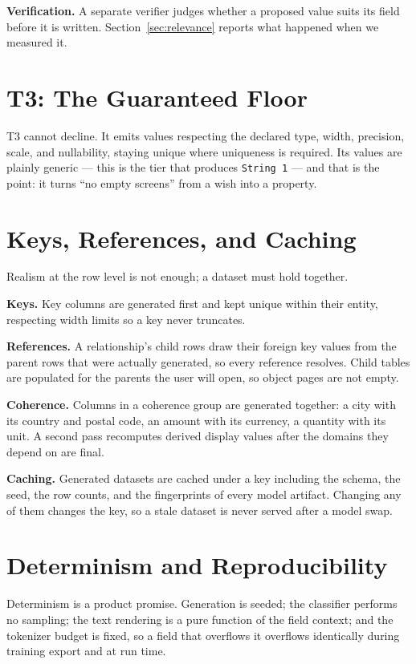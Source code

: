 \documentclass[journal]{IEEEtran}
\newcommand{\code}[1]{\texttt{#1}}
\begin{document}
\textbf{Verification.} A separate verifier judges whether a proposed
value suits its field before it is written. Section~\ref{sec:relevance}
reports what happened when we measured it.

\section{T3: The Guaranteed Floor}
\label{sec:t3}

T3 cannot decline. It emits values respecting the declared type, width,
precision, scale, and nullability, staying unique where uniqueness is
required. Its values are plainly generic --- this is the tier that
produces \code{String 1} --- and that is the point: it turns ``no empty
screens'' from a wish into a property.

\section{Keys, References, and Caching}
\label{sec:relations}

Realism at the row level is not enough; a dataset must hold together.

\textbf{Keys.} Key columns are generated first and kept unique within
their entity, respecting width limits so a key never truncates.

\textbf{References.} A relationship's child rows draw their foreign key
values from the parent rows that were actually generated, so every
reference resolves. Child tables are populated for the parents the user
will open, so object pages are not empty.

\textbf{Coherence.} Columns in a coherence group are generated together:
a city with its country and postal code, an amount with its currency, a
quantity with its unit. A second pass recomputes derived display values
after the domains they depend on are final.

\textbf{Caching.} Generated datasets are cached under a key including
the schema, the seed, the row counts, and the fingerprints of every
model artifact. Changing any of them changes the key, so a stale dataset
is never served after a model swap.

\section{Determinism and Reproducibility}
\label{sec:determinism}

Determinism is a product promise. Generation is seeded; the classifier
performs no sampling; the text rendering is a pure function of the field
context; and the tokenizer budget is fixed, so a field that overflows it
overflows identically during training export and at run time.
\end{document}
